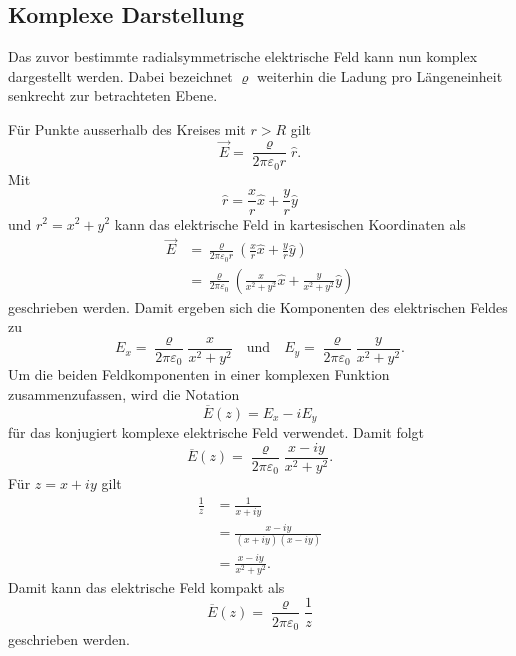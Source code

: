 \subsection{Komplexe Darstellung}

Das zuvor bestimmte radialsymmetrische elektrische Feld kann nun komplex dargestellt werden.
Dabei bezeichnet $\varrho$ weiterhin die Ladung pro Längeneinheit senkrecht zur betrachteten Ebene.

Für Punkte ausserhalb des Kreises mit $r>R$ gilt
\begin{equation*}
    \vec{E} = \frac{\varrho}{2\pi\varepsilon_0 r}\hat{r}.
\end{equation*}
Mit
\begin{equation*}
    \hat{r}
    =
    \frac{x}{r}\hat{x}
    +
    \frac{y}{r}\hat{y}
\end{equation*}
und $r^2=x^2+y^2$ kann das elektrische Feld in kartesischen Koordinaten als
\begin{align*}
    \vec{E}
    &=
    \frac{\varrho}{2\pi\varepsilon_0 r}
    \left(
        \frac{x}{r}\hat{x}
        +
        \frac{y}{r}\hat{y}
    \right)
    \\
    &=
    \frac{\varrho}{2\pi\varepsilon_0}
    \left(
        \frac{x}{x^2+y^2}\hat{x}
        +
        \frac{y}{x^2+y^2}\hat{y}
    \right)
\end{align*}
geschrieben werden.
Damit ergeben sich die Komponenten des elektrischen Feldes zu
\begin{equation*}
    E_x = \frac{\varrho}{2\pi\varepsilon_0}\frac{x}{x^2+y^2}\quad\text{und}\quad
    E_y = \frac{\varrho}{2\pi\varepsilon_0}\frac{y}{x^2+y^2}.
\end{equation*}
Um die beiden Feldkomponenten in einer komplexen Funktion zusammenzufassen, wird die Notation
\begin{equation*}
	\overline{E}(z)=E_x-iE_y
\end{equation*}
für das konjugiert komplexe elektrische Feld verwendet.
Damit folgt
\begin{equation*}
    \overline{E}(z) = \frac{\varrho}{2\pi\varepsilon_0}\frac{x-iy}{x^2+y^2}.
\end{equation*}
Für $z=x+iy$ gilt
\begin{align*}
    \frac{1}{z}
    &=
    \frac{1}{x+iy}
    \\
    &=
    \frac{x-iy}{(x+iy)(x-iy)}
    \\
    &=
    \frac{x-iy}{x^2+y^2}.
\end{align*}
Damit kann das elektrische Feld kompakt als
\begin{equation*}
        \overline{E}(z) = \frac{\varrho}{2\pi\varepsilon_0}\frac{1}{z}
\end{equation*}
geschrieben werden.

